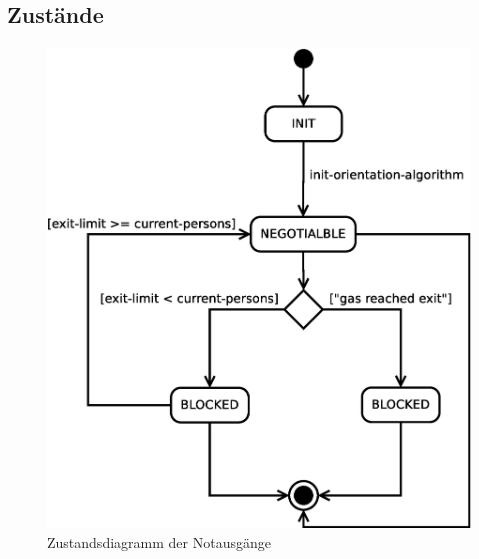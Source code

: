 \subsection{Zustände}


\begin{figure}
\centering
\includegraphics[height=0.6\textwidth]{simulationsumgebung/exit.eps}
\caption{Zustandsdiagramm der Notausgänge}
\label{fig:exit}
\end{figure}

%
%
%
%
%
%
%
%


